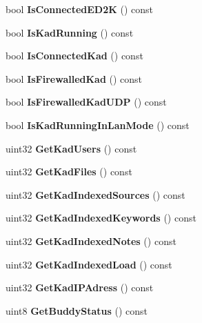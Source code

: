 \begin{DoxyCompactItemize}
\item 
bool {\bfseries IsConnectedED2K} () const \label{classCamuleApp_add0f06306c6526571ef32c74684e6695}

\item 
bool {\bfseries IsKadRunning} () const \label{classCamuleApp_a47f0a480c82546a5b05837d142723d5b}

\item 
bool {\bfseries IsConnectedKad} () const \label{classCamuleApp_a1b6750f67fa8c391e42b6cf15a31bbb3}

\item 
bool {\bfseries IsFirewalledKad} () const \label{classCamuleApp_a5b5fbaac2d62e28ba288f3333be3577c}

\item 
bool {\bfseries IsFirewalledKadUDP} () const \label{classCamuleApp_abda76811a6e3337d831878486cf60c0a}

\item 
bool {\bfseries IsKadRunningInLanMode} () const \label{classCamuleApp_a2de47e13d1f323302c33f6874e5e09d2}

\item 
uint32 {\bfseries GetKadUsers} () const \label{classCamuleApp_afb279ef0b80c8ff77cedc0c4310702c5}

\item 
uint32 {\bfseries GetKadFiles} () const \label{classCamuleApp_a5f8a11b3ba9d8c238521cf2dcdf5bcbf}

\item 
uint32 {\bfseries GetKadIndexedSources} () const \label{classCamuleApp_a8e854617e1637018e136485675d239a8}

\item 
uint32 {\bfseries GetKadIndexedKeywords} () const \label{classCamuleApp_aabe7ca8abd94933df81c6d70fe6c42a2}

\item 
uint32 {\bfseries GetKadIndexedNotes} () const \label{classCamuleApp_af09b8093856cdbc710187811f265fefe}

\item 
uint32 {\bfseries GetKadIndexedLoad} () const \label{classCamuleApp_abc42c50dd8824b055bf722538c24690c}

\item 
uint32 {\bfseries GetKadIPAdress} () const \label{classCamuleApp_aba957123f7d1b85e1a594596e7a87ac3}

\item 
uint8 {\bfseries GetBuddyStatus} () const \label{classCamuleApp_ae20b5e96b8a800990759c136b753182d}


\end{DoxyCompactItemize}
